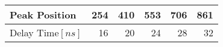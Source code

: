 \begin{tabular}{lrrrrr}
\toprule
Peak Position &  254 &  410 &  553 &  706 &  861 \\
\midrule
   Delay Time$[\si{ns}]$ &   16 &   20 &   24 &   28 &   32 \\
\bottomrule
\end{tabular}

